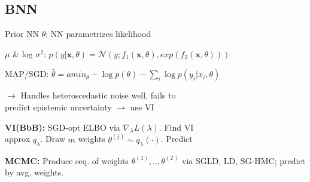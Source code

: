 \subsection*{BNN} Prior NN $\theta$; NN parametrizes likelihood

$\mu$ \& log $\sigma^{2}$: \; $p(y|\mathbf{x}, \theta ) = \mathcal{N}(y;f_{1}(\mathbf{x}, \theta), exp(f_{2}(\mathbf{x}, \theta)))$

\vspace*{-0.5mm}
MAP/SGD: $\hat{\theta} = amin_\theta - \log p(\theta) - \sum_{i} \log p(y_i | x_i, \theta)$

$\rightarrow$ Handles heteroscedastic noise well, fails to \\
predict epistemic uncertainty $\rightarrow$ use VI

\vspace*{-0.5mm}
\textbf{VI(BbB):} \; SGD-opt ELBO via $\nabla_\lambda L(\lambda)$. Find VI \\
approx $q_\lambda$. Draw $m$ weights $\theta^{(j)} \sim q_\lambda(\cdot)$. Predict 

\vspace*{-0.5mm}
\textbf{MCMC:} \; Produce seq. of weights {\fontsize{9}{6}\selectfont $\theta^{(1)},..,\theta^{(T)}$} via SGLD, LD, SG-HMC; predict by avg. weights.

